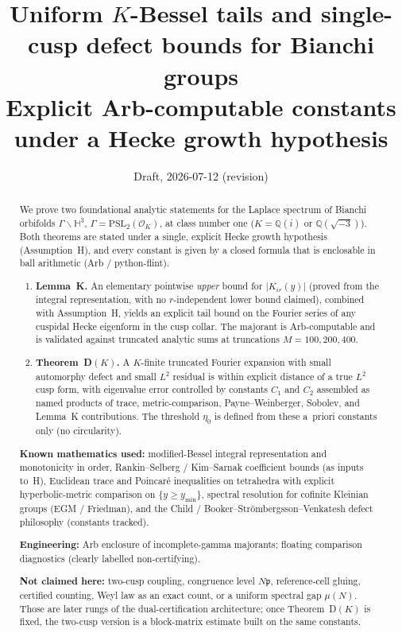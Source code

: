 \documentclass[11pt]{amsart}
\title[Lemma K and Theorem D$(K)$]{Uniform $K$-Bessel tails and single-cusp
defect bounds for Bianchi groups\\
\large Explicit Arb-computable constants under a Hecke growth hypothesis}
\author{}
\date{Draft, 2026-07-12 (revision)}
\theoremstyle{definition}
\newcommand{\HH}{\mathbb{H}^3}
\newcommand{\QQ}{\mathbb{Q}}
\newcommand{\PSL}{\mathrm{PSL}}
\newcommand{\OK}{\mathcal{O}_K}
\begin{document}
\begin{abstract}
We prove two foundational analytic statements for the Laplace spectrum of
Bianchi orbifolds $\Gamma\backslash\HH$, $\Gamma=\PSL_2(\OK)$, at class number
one ($K=\QQ(i)$ or $\QQ(\sqrt{-3})$).  Both theorems are stated under a
single, explicit Hecke growth hypothesis (Assumption~H), and every constant
is given by a closed formula that is enclosable in ball arithmetic (Arb /
python-flint).

\begin{enumerate}[leftmargin=*,itemsep=2pt]
\item \textbf{Lemma~K.}  An elementary pointwise \emph{upper} bound for
$|K_{ir}(y)|$ (proved from the integral representation, with no
$r$-independent lower bound claimed), combined with Assumption~H, yields an
explicit tail bound on the Fourier series of any cuspidal Hecke eigenform in
the cusp collar.  The majorant is Arb-computable and is validated against
truncated analytic sums at truncations $M=100,200,400$.
\item \textbf{Theorem~D$(K)$.}  A $K$-finite truncated Fourier expansion
with small automorphy defect and small $L^2$ residual is within
explicit distance of a true $L^2$ cusp form, with eigenvalue error
controlled by constants $C_1$ and $C_2$ assembled as named products of
trace, metric-comparison, Payne--Weinberger, Sobolev, and Lemma~K
contributions.  The threshold $\eta_0$ is defined from these a~priori
constants only (no circularity).
\end{enumerate}

\noindent\textbf{Known mathematics used:} modified-Bessel integral
representation and monotonicity in order, Rankin--Selberg / Kim--Sarnak
coefficient bounds (as inputs to~H), Euclidean trace and Poincar\'e
inequalities on tetrahedra with explicit hyperbolic-metric comparison on
$\{y\ge y_{\min}\}$, spectral resolution for cofinite Kleinian groups
(EGM / Friedman), and the Child / Booker--Str\"ombergsson--Venkatesh
defect philosophy (constants tracked).

\noindent\textbf{Engineering:} Arb enclosure of incomplete-gamma majorants;
floating comparison diagnostics (clearly labelled non-certifying).

\noindent\textbf{Not claimed here:} two-cusp coupling, congruence level
$N\mathfrak{p}$, reference-cell gluing, certified counting, Weyl law as an
exact count, or a uniform spectral gap $\mu(N)$.  Those are later rungs of
the dual-certification architecture; once Theorem~D$(K)$ is fixed, the
two-cusp version is a block-matrix estimate built on the same constants.
\end{abstract}
\maketitle
\end{document}
